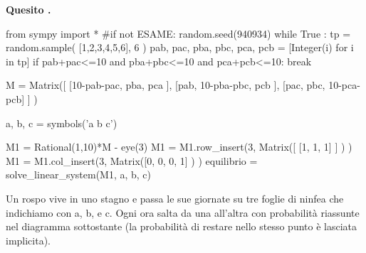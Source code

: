 \documentclass[11pt,twoside,a4paper]{article}
\def\Pr{{\rm Pr\,}}
\newcounter{quesito}
\newenvironment{question}{\bigskip\addtocounter{quesito}{1}\par\textbf{Quesito \thequesito.}}{\vspace{\parskip}}
\begin{document}
\clearpage
\begin{question}
\def\Pr{{\rm Pr\,}}
\def\pyl#1{\py{latex(#1) } }
\everymath{\displaystyle}
\def\nicefrac#1#2{#1/#2}
\renewcommand{\arraystretch}{1.3}
\begin{pycode}
from sympy import *
#if not ESAME: 
random.seed(940934)
while True :
    tp  =  random.sample( [1,2,3,4,5,6], 6 ) 
    pab, pac, pba, pbc, pca, pcb = [Integer(i) for i in tp] 
    if pab+pac<=10 and pba+pbc<=10 and pca+pcb<=10: break
    
M = Matrix([ [10-pab-pac, pba,        pca       ],
             [pab,         10-pba-pbc, pcb       ],
             [pac,         pbc,        10-pca-pcb] ] )
    
a, b, c = symbols('a b c')

M1 = Rational(1,10)*M - eye(3)
M1 = M1.row_insert(3, Matrix([ [1, 1, 1] ] ) )
M1 = M1.col_insert(3, Matrix([0, 0, 0, 1] ) )
equilibrio = solve_linear_system(M1, a, b, c)

\end{pycode}
Un rospo vive in uno stagno e passa le sue giornate su tre foglie di ninfea che indichiamo con {\sf a}, {\sf b}, e {\sf c}. Ogni ora salta da una all'altra con probabilità riassunte nel diagramma sottostante (la probabilità di restare nello stesso punto è lasciata implicita). 




\hfil
{}


\end{question}
\end{document}
